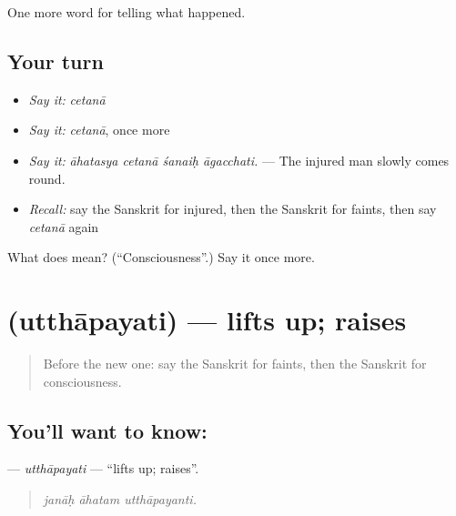 \begin{grammarlens}[title={What you've built}]
One more word for telling what happened.
\end{grammarlens}

\subsection*{Your turn}
\begin{itemize}
\raggedright
  \item \emph{Say it:} \emph{cetanā}
  \item \emph{Say it:} \emph{cetanā}, once more
  \item \emph{Say it:} \emph{āhatasya cetanā śanaiḥ āgacchati.} — The injured man slowly comes round.
  \item \emph{Recall:} say the Sanskrit for injured, then the Sanskrit for faints, then say \emph{cetanā} again
\end{itemize}

\begin{tcolorbox}[breakable,colback=teal!4,colframe=teal!35!black,title={Before you move on}]
What does  mean? (\textquotedblleft{}Consciousness\textquotedblright{}.) Say it once more.
\end{tcolorbox}
\section[\texorpdfstring{\sk{उत्थापयति} (utthāpayati)}{उत्थापयति (utthāpayati)}]{ (utthāpayati) — lifts up; raises}

\label{lesson:SA-C295-utthapayati}



\begin{quote}
Before the new one: say the Sanskrit for faints, then the Sanskrit for consciousness.
\end{quote}

\subsection*{You'll want to know: }
\textbf{} — \emph{utthāpayati} — \textquotedblleft{}lifts up; raises\textquotedblright{}.

\begin{quote}
  
\end{quote}

\begin{quote}
\emph{janāḥ āhatam utthāpayanti.}
\end{quote}

